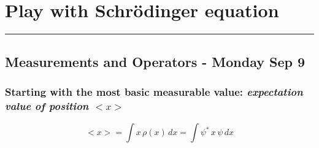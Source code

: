 \section{Play with Schrödinger equation}
\vspace{-15pt}\noindent\rule{\textwidth}{0.1pt}\vspace{-10pt}
    \subsection{\hfill \small Measurements and Operators - Monday Sep 9}
    \subsubsection*{Starting with the most basic measurable value: \textit{expectation value of position} $<x>$}
    \[
        <x> = \int x\,\rho(x)\,dx = \int \psi^*\,x\,\psi\,dx
    \]

